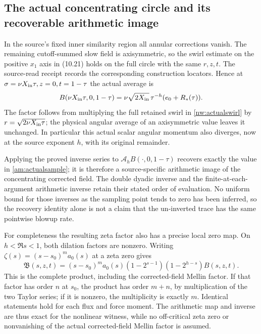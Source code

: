 \subsection*{The actual concentrating circle and its recoverable arithmetic image}

In the source's fixed inner similarity region all annular corrections
vanish. The remaining cutoff-summed slow field is axisymmetric, so
the swirl estimate on the positive $x_1$ axis in (10.21) holds on
the full circle with the same $r,z,t$. The source-read receipt
records the corresponding construction locators. Hence at
$\sigma=\nu X_{\rm in}\tau,z=0,t=1-\tau$ the actual average is
\begin{equation}
 B(\nu X_{\rm in}\tau,0,1-\tau)
   =\nu\sqrt{2X_{\rm in}}\,\tau^{-h}(e_0+R_*(\tau)).
 \label{am:actualsample}
\end{equation}
The factor follows from multiplying the full retained swirl in
\eqref{nw:actualswirl} by $r=\sqrt{2\nu X_{\rm in}\tau}$;
the physical angular average of an axisymmetric value leaves it
unchanged. In particular this actual scalar angular momentum also
diverges, now at the source exponent $h$, with its original remainder.

Applying the proved inverse series to
$\mathcal A_hB(\cdot,0,1-\tau)$ recovers exactly the value in
\eqref{am:actualsample}; it is therefore a source-specific arithmetic
image of the concentrating corrected field. The double dyadic inverse
and the finite-at-each-argument arithmetic inverse retain their stated
order of evaluation. No uniform bound for those inverses as the
sampling point tends to zero has been inferred, so the recovery
identity alone is not a claim that the un-inverted trace has the same
pointwise blowup rate.

For completeness the resulting zeta factor also has a precise local
zero map. On $h<\Re s<1$, both dilation factors are nonzero.
Writing $\zeta(s)=(s-s_0)^m a_0(s)$ at a zeta zero gives
\[
 \mathfrak B(s,z,t)=(s-s_0)^m a_0(s)
       (1-2^{s-1})(1-2^{h-s})\widehat B(s,z,t).
\]
This is the complete product, including the corrected-field Mellin
factor. If that factor has order $n$ at $s_0$, the product has order
$m+n$, by multiplication of the two Taylor series; if it is nonzero,
the multiplicity is exactly $m$. Identical statements hold for each
flux and force moment. The arithmetic map and inverse are thus exact
for the nonlinear witness, while no off-critical zeta zero or
nonvanishing of the actual corrected-field Mellin factor is assumed.
